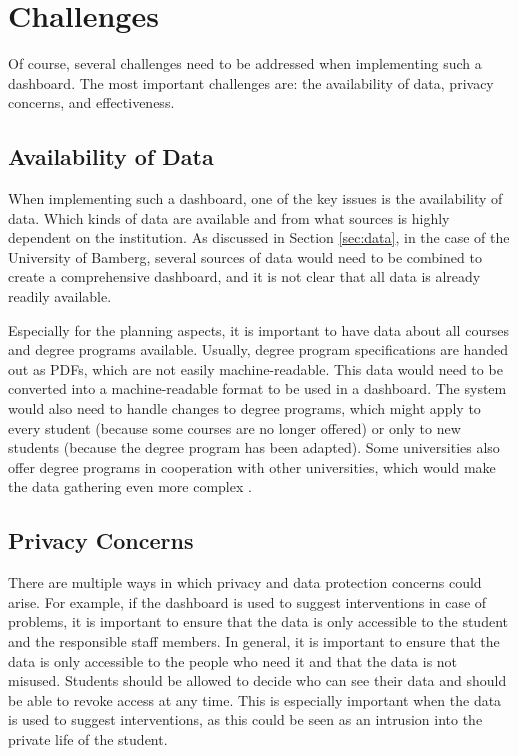 \section{Challenges}
\label{sec:challenges}

Of course, several challenges need to be addressed when implementing such a dashboard. The most important challenges are: the availability of data, privacy concerns, and effectiveness.

\subsection{Availability of Data}

When implementing such a dashboard, one of the key issues is the availability of data. Which kinds of data are available and from what sources is highly dependent on the institution. As discussed in Section \ref{sec:data}, in the case of the University of Bamberg, several sources of data would need to be combined to create a comprehensive dashboard, and it is not clear that all data is already readily available.

Especially for the planning aspects, it is important to have data about all courses and degree programs available. Usually, degree program specifications are handed out as PDFs, which are not easily machine-readable. This data would need to be converted into a machine-readable format to be used in a dashboard. The system would also need to handle changes to degree programs, which might apply to every student (because some courses are no longer offered) or only to new students (because the degree program has been adapted).
Some universities also offer degree programs in cooperation with other universities, which would make the data gathering even more complex \cite{Dashboard-StudentProgress}.

\subsection{Privacy Concerns}
There are multiple ways in which privacy and data protection concerns could arise. For example, if the dashboard is used to suggest interventions in case of problems, it is important to ensure that the data is only accessible to the student and the responsible staff members.
In general, it is important to ensure that the data is only accessible to the people who need it and that the data is not misused. Students should be allowed to decide who can see their data and should be able to revoke access at any time. This is especially important when the data is used to suggest interventions, as this could be seen as an intrusion into the private life of the student.

